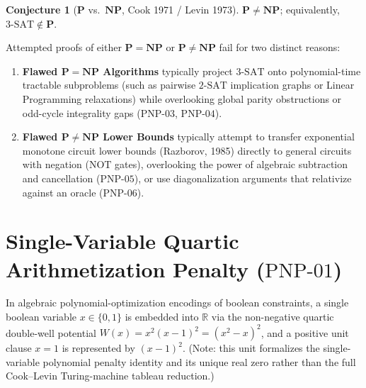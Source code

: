 \documentclass[11pt,a4paper]{article}
\theoremstyle{plain}
\theoremstyle{definition}
\newtheorem{conjecture}[theorem]{Conjecture}
\theoremstyle{remark}
\newcommand{\R}{\mathbb{R}}
\newcommand{\ClassP}{\mathbf{P}}
\newcommand{\ClassNP}{\mathbf{NP}}
\begin{document}
\begin{conjecture}[$\ClassP$ vs.\ $\ClassNP$, Cook 1971 / Levin 1973]
$\ClassP \ne \ClassNP$; equivalently, $\mathrm{3\text{-}SAT} \notin \ClassP$.
\end{conjecture}

Attempted proofs of either $\ClassP = \ClassNP$ or $\ClassP \ne \ClassNP$ fail for two distinct reasons:
\begin{enumerate}
  \item \textbf{Flawed $\ClassP = \ClassNP$ Algorithms} typically project $3\text{-SAT}$ onto polynomial-time tractable subproblems (such as pairwise $2\text{-SAT}$ implication graphs or Linear Programming relaxations) while overlooking global parity obstructions or odd-cycle integrality gaps ($\mathrm{PNP\text{-}03}$, $\mathrm{PNP\text{-}04}$).
  \item \textbf{Flawed $\ClassP \ne \ClassNP$ Lower Bounds} typically attempt to transfer exponential monotone circuit lower bounds (Razborov, 1985) directly to general circuits with negation ($\mathrm{NOT}$ gates), overlooking the power of algebraic subtraction and cancellation ($\mathrm{PNP\text{-}05}$), or use diagonalization arguments that relativize against an oracle ($\mathrm{PNP\text{-}06}$).
\end{enumerate}

\section{Single-Variable Quartic Arithmetization Penalty (\texorpdfstring{$\mathrm{PNP\text{-}01}$}{PNP-01})}

In algebraic polynomial-optimization encodings of boolean constraints, a single boolean variable $x \in \{0, 1\}$ is embedded into $\R$ via the non-negative quartic double-well potential $W(x) = x^2(x - 1)^2 = (x^2 - x)^2$, and a positive unit clause $x = 1$ is represented by $(x - 1)^2$. (Note: this unit formalizes the single-variable polynomial penalty identity and its unique real zero rather than the full Cook--Levin Turing-machine tableau reduction.)
\end{document}
